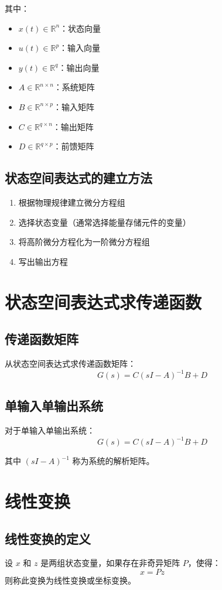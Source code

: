 \documentclass[12pt,a4paper]{article}
\begin{document}
其中：
\begin{itemize}
    \item $x(t) \in \mathbb{R}^n$：状态向量
    \item $u(t) \in \mathbb{R}^p$：输入向量
    \item $y(t) \in \mathbb{R}^q$：输出向量
    \item $A \in \mathbb{R}^{n \times n}$：系统矩阵
    \item $B \in \mathbb{R}^{n \times p}$：输入矩阵
    \item $C \in \mathbb{R}^{q \times n}$：输出矩阵
    \item $D \in \mathbb{R}^{q \times p}$：前馈矩阵
\end{itemize}

\subsection{状态空间表达式的建立方法}
\begin{enumerate}
    \item 根据物理规律建立微分方程组
    \item 选择状态变量（通常选择能量存储元件的变量）
    \item 将高阶微分方程化为一阶微分方程组
    \item 写出输出方程
\end{enumerate}

\section{状态空间表达式求传递函数}

\subsection{传递函数矩阵}
从状态空间表达式求传递函数矩阵：
\[G(s) = C(sI - A)^{-1}B + D\]

\subsection{单输入单输出系统}
对于单输入单输出系统：
\[G(s) = C(sI - A)^{-1}B + D\]

其中 $(sI - A)^{-1}$ 称为系统的解析矩阵。

\section{线性变换}

\subsection{线性变换的定义}
设 $x$ 和 $z$ 是两组状态变量，如果存在非奇异矩阵 $P$，使得：
\[x = Pz\]
则称此变换为线性变换或坐标变换。
\end{document}
